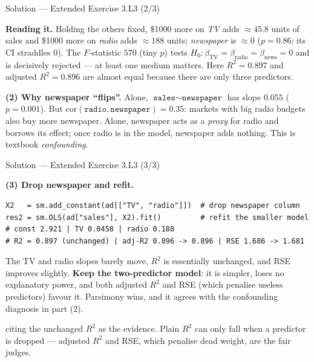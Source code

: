 \documentclass[aspectratio=169,11pt]{beamer}
\begin{document}
\begin{frame}{Solution --- Extended Exercise 3.L3 (2/3)}
  \begin{solutionbox}
    \textbf{Reading it.} Holding the others fixed, \$1000 more on
    \emph{TV} adds $\approx 45.8$ units of sales and \$1000 more on
    \emph{radio} adds $\approx 188$ units; \emph{newspaper} is $\approx 0$
    ($p=0.86$; its CI straddles $0$). The $F$-statistic $570$ (tiny $p$)
    tests $H_0:\beta_{\text{TV}}=\beta_{\text{radio}}=\beta_{\text{news}}=0$
    and is decisively rejected --- at least one medium matters. Here
    $R^2=0.897$ and adjusted $R^2=0.896$ are almost equal because there
    are only three predictors.

    \textbf{(2) Why newspaper ``flips''.} Alone,
    $\texttt{sales}\sim\texttt{newspaper}$ has slope $0.055$ ($p=0.001$).
    But $\mathrm{cor}(\texttt{radio},\texttt{newspaper})=0.35$: markets
    with big radio budgets also buy more newspaper. Alone, newspaper acts
    as a \emph{proxy} for radio and borrows its effect; once radio is in
    the model, newspaper adds nothing. This is textbook \emph{confounding}.
  \end{solutionbox}
\end{frame}

\begin{frame}[fragile]{Solution --- Extended Exercise 3.L3 (3/3)}
  \begin{solutionbox}
    \textbf{(3) Drop newspaper and refit.}
\begin{lstlisting}
X2   = sm.add_constant(ad[["TV", "radio"]])  # drop newspaper column
res2 = sm.OLS(ad["sales"], X2).fit()         # refit the smaller model
# const 2.921 | TV 0.0458 | radio 0.188
# R2 = 0.897 (unchanged) | adj-R2 0.896 -> 0.896 | RSE 1.686 -> 1.681
\end{lstlisting}
    The TV and radio slopes barely move, $R^2$ is essentially unchanged,
    and RSE improves slightly. \textbf{Keep the two-predictor model}: it
    is simpler, loses no explanatory power, and both adjusted $R^2$ and
    RSE (which penalise useless predictors) favour it. Parsimony wins,
    and it agrees with the confounding diagnosis in part (2).
  \end{solutionbox}
  \begin{mistake}
    citing the unchanged $R^2$ as the evidence.
    Plain $R^2$ can only fall when a predictor is dropped --- adjusted
    $R^2$ and RSE, which penalise dead weight, are the fair judges.
  \end{mistake}
\end{frame}
\end{document}
